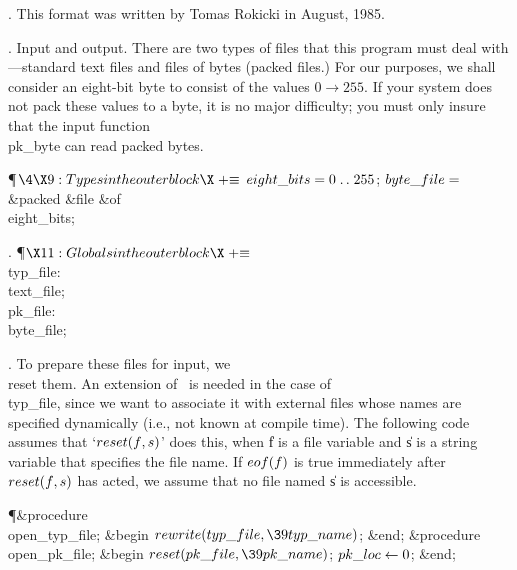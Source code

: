 \fi

. This format was written by Tomas Rokicki in August, 1985.

\fi

.  Input and output.
There are two types of files that this program must deal with---standard
text files and files of bytes (packed files.)
For our purposes, we shall consider an eight-bit byte to consist of the
values $0\to255$.  If your system does not pack these values to a byte, it is
no major difficulty; you must only insure that the input function
\\{pk\_byte} can read packed bytes.

\Y\P$\4\X9:Types in the outer block\X\mathrel{+}\S$\6
$\\{eight\_bits}=0\to255$;\6
$\\{byte\_file}=$\1\5
\&{packed} \&{file} \1\&{of}\5
\\{eight\_bits};\2\2\par
\fi

. \P$\X11:Globals in the outer block\X\mathrel{+}\S$\6
\4\\{typ\_file}: \\{text\_file};\6
\4\\{pk\_file}: \\{byte\_file};\par
\fi

. To prepare these files for input, we \\{reset} them. An extension of
\PASCAL\ is needed in the case of \\{typ\_file}, since we want to associate
it with external files whose names are specified dynamically (i.e., not
known at compile time). The following code assumes that `$\\{reset}(\|f,\|s)$'
does this, when \|f is a file variable and \|s is a string variable that
specifies the file name. If $\\{eof}(\|f)$ is true immediately after
$\\{reset}(\|f,\|s)$ has acted, we assume that no file named \|s is accessible.

\Y\P\4\&{procedure}\1\  \\{open\_typ\_file};\2\6
\&{begin} $\\{rewrite}(\\{typ\_file},\39\\{typ\_name})$;\6
\&{end};\7
\4\&{procedure}\1\  \\{open\_pk\_file};\2\6
\&{begin} $\\{reset}(\\{pk\_file},\39\\{pk\_name})$;\5
$\\{pk\_loc}\K0$;\6
\&{end};\par
\fi

